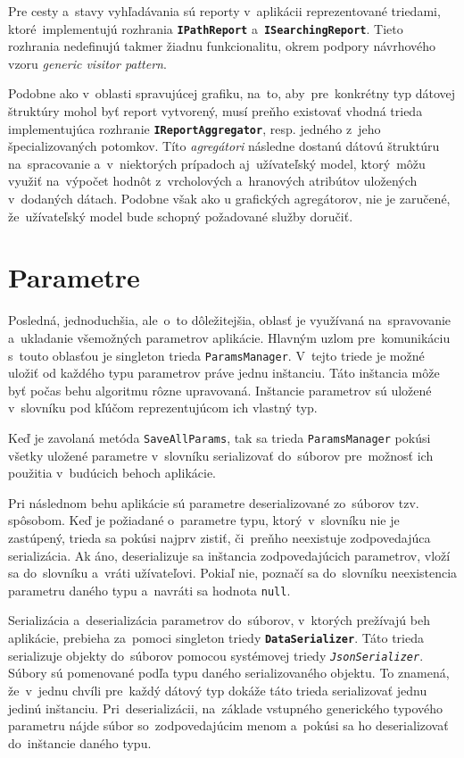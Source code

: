 \bigskip

Pre cesty a~stavy vyhľadávania sú reporty v~aplikácii reprezentované triedami, ktoré~implementujú rozhrania \textbf{\texttt{IPathReport}} a~\textbf{\texttt{ISearchingReport}}. Tieto rozhrania nedefinujú takmer žiadnu funkcionalitu, okrem podpory návrhového vzoru \textit{generic visitor pattern}.

Podobne ako v~oblasti spravujúcej grafiku, na~to, aby~pre~konkrétny typ dátovej štruktúry mohol byť report vytvorený, musí preňho existovať vhodná trieda implementujúca rozhranie \textbf{\texttt{IReportAggregator}}, resp. jedného z~jeho špecializovaných potomkov. Títo \textit{agregátori} následne dostanú dátovú štruktúru na~spracovanie a~v~niektorých prípadoch aj~užívateľský model, ktorý~môžu využiť na~výpočet hodnôt z~vrcholových a~hranových atribútov uložených v~dodaných dátach. Podobne však ako u grafických agregátorov, nie je zaručené, že~užívateľský model bude schopný požadované služby doručiť. 

\section{Parametre}

Posledná, jednoduchšia, ale~o~to dôležitejšia, oblasť je využívaná na~spravovanie a~ukladanie všemožných parametrov aplikácie. Hlavným uzlom pre~komunikáciu s~touto oblasťou je singleton trieda \texttt{ParamsManager}. V~tejto triede je možné uložiť od každého typu parametrov práve jednu inštanciu. Táto inštancia môže byť počas behu algoritmu rôzne upravovaná. Inštancie parametrov sú uložené v~slovníku pod kľúčom reprezentujúcom ich vlastný typ.  

Keď je zavolaná metóda \texttt{SaveAllParams}, tak sa trieda \texttt{ParamsManager} pokúsi všetky uložené parametre v~slovníku serializovať do~súborov pre~možnosť ich použitia v~budúcich behoch aplikácie.

Pri následnom behu aplikácie sú parametre deserializované zo~súborov tzv.  spôsobom. Keď je požiadané o~parametre typu, ktorý~v~slovníku nie je zastúpený, trieda sa pokúsi najprv zistiť, či~preňho neexistuje zodpovedajúca serializácia. Ak áno, deserializuje sa inštancia zodpovedajúcich parametrov, vloží sa do~slovníku a~vráti užívateľovi. Pokiaľ nie, poznačí sa do~slovníku neexistencia parametru daného typu a~navráti sa hodnota \texttt{null}.  

Serializácia a~deserializácia parametrov do~súborov, v~ktorých prežívajú beh aplikácie, prebieha za~pomoci singleton triedy \textbf{\texttt{DataSerializer}}. Táto trieda serializuje objekty do~súborov pomocou systémovej triedy \textit{\texttt{JsonSerializer}}. Súbory sú pomenované podľa typu daného serializovaného objektu. To znamená, že~v~jednu chvíli pre~každý dátový typ dokáže táto trieda serializovať jednu jedinú inštanciu. Pri~deserializácii, na~základe vstupného generického typového parametru nájde súbor so~zodpovedajúcim menom a~pokúsi sa ho deserializovať do~inštancie daného typu.


  